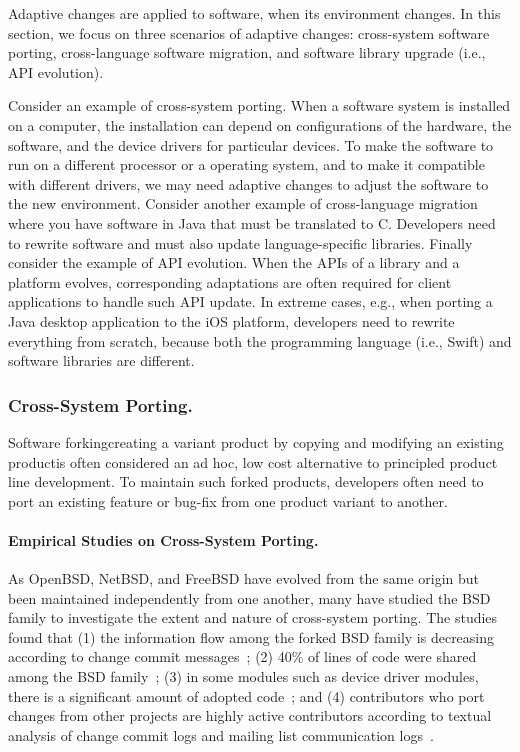 Adaptive changes are applied to software, when its environment changes. In this section, we focus on three scenarios of adaptive changes: cross-system software porting, cross-language software migration, and software library upgrade (i.e., API evolution).

Consider an example of cross-system porting. When a software system is installed on a computer, the installation can depend on configurations of the hardware, the software, and the device drivers for particular devices. To make the software to run on a different processor or a operating system, and to make it compatible with different drivers, we may need adaptive changes to adjust the software to the new environment. 
Consider another example of cross-language migration where you have software in Java that must be translated to C. Developers need to rewrite software and must also update language-specific libraries.
Finally consider the example of API evolution. When the APIs of a library and a platform evolves, corresponding adaptations are often required for client applications to handle such API update. In extreme cases, e.g., when porting a Java desktop application to the iOS platform, developers need to rewrite everything from scratch, because both the programming language (i.e., Swift) and software libraries are different. 

\subsubsection{Cross-System Porting.} 
Software forking\textemdash creating a variant product by copying and modifying an existing product\textemdash is often considered an ad hoc, low cost alternative to principled product line development. To maintain such forked products, developers often need to port an existing feature or bug-fix from one product variant to another. 

\paragraph{{Empirical Studies on Cross-System Porting.}}
As OpenBSD, NetBSD, and FreeBSD have evolved from the same origin but been maintained independently from one another, many have studied the BSD family to investigate the extent and nature of cross-system porting. The studies found that 
(1) the information flow among the forked BSD family is decreasing according to change commit messages~\cite{Fischer2005}; 
(2) 40\% of lines of code were shared among the BSD family~\cite{Yamamoto2005}; 
(3) in some modules such as device driver modules, there is a significant amount of adopted code~\cite{Cordy2011:largecloning}; and
(4) contributors who port changes from other projects are highly active contributors according to textual analysis of change commit logs and mailing list communication logs~\cite{Canfora2011:bsdfork}. 


